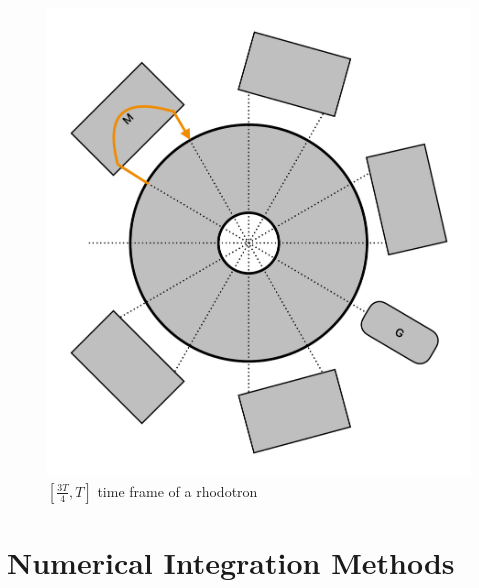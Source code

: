 \documentclass[a4paper,oneside,12pt]{report}
\numberwithin{equation}{chapter}
\begin{document}
\begin{figure}[H]
    \centering
    \includegraphics[width=\textwidth]{./figures/illustrations/rhod4.pdf}
    \caption{$[\frac{3T}{4}, T]$ time frame of a rhodotron}
    \label{fig:rhod_cycle_4}
\end{figure}




\newpage



\section{Numerical Integration Methods}
\end{document}
